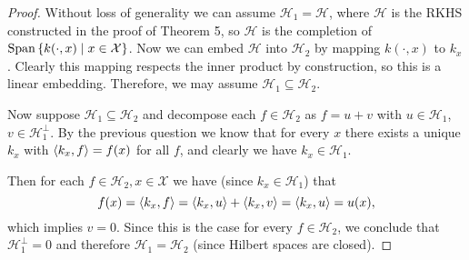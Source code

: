\documentclass{article}
\theoremstyle{plain}
\theoremstyle{remark}
\newcommand{\Cal}{\mathcal}
\newcommand\XX{\Cal X}
\newcommand\HH{\Cal H}
\DeclarePairedDelimiter{\ang}{\langle}{\rangle}
\renewcommand\P{^\perp}
\DeclareMathOperator{\Span}{Span}
\begin{document}
\begin{proof}
	Without loss of generality we can assume $\HH_1 = \HH$, where $\HH$ is the RKHS constructed in the proof of Theorem 5, so $\HH$ is the completion of $\Span\qty{k(\cdot, x) \mid x \in \XX}$. Now we can embed $\HH$ into $\HH_2$ by mapping $k(\cdot, x)$ to $k_x$. Clearly this mapping respects the inner product by construction, so this is a linear embedding. Therefore, we may assume $\HH_1 \subseteq \HH_2$. 
	
	Now suppose $\HH_1 \subseteq \HH_2$ and decompose each $f \in \HH_2$ as $f = u + v$ with $u \in \HH_1$, $v \in \HH_1\P$. By the previous question we know that for every $x$ there exists a unique $k_x$ with $\ang{k_x, f} = f(x)$ for all $f$, and clearly we have $k_x \in \HH_1$. 
	
	Then for each $f \in \HH_2, x \in \XX$ we have (since $k_x \in \HH_1$) that
	\[
	f(x) = \ang{k_x, f} = \ang{k_x, u} + \ang{k_x, v} = \ang{k_x, u} = u(x),
	\]
	which implies $v = 0$. Since this is the case for every $f \in \HH_2$, we conclude that $\HH_1\P = 0$ and therefore $\HH_1 = \HH_2$ (since Hilbert spaces are closed). 
\end{proof}
\end{document}
